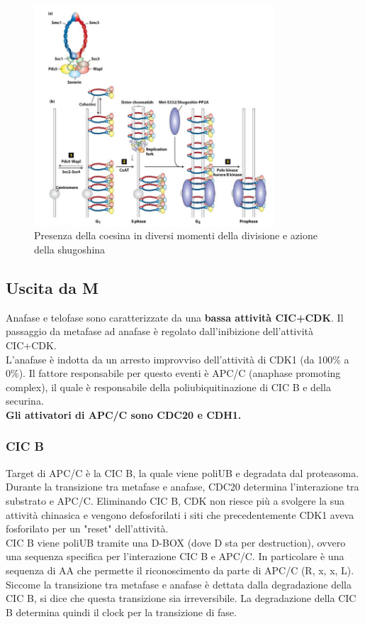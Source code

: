             \begin{figure}[h]
                \centering
                \includegraphics[width=0.8\textwidth]{images/shugoshina.JPG}
                \caption{\small Presenza della coesina in diversi momenti della divisione e azione della shugoshina}
                \label{fig:mesh1}
            \end{figure}
    
    \subsection{Uscita da M}
        Anafase e telofase sono caratterizzate da una \textbf{bassa attività CIC+CDK}. Il passaggio da metafase ad anafase è regolato dall'inibizione dell'attività CIC+CDK.\\
        L'anafase è indotta da un arresto improvviso dell'attività di CDK1 (da 100\% a 0\%).
        Il fattore responsabile per questo eventi è APC/C (anaphase promoting complex), il quale è responsabile della poliubiquitinazione di CIC B e della securina.\\
        \textbf{Gli attivatori di APC/C sono CDC20 e CDH1.}
        
        \subsubsection{CIC B}
            Target di APC/C è la CIC B, la quale viene poliUB e degradata dal proteasoma. Durante la transizione tra metafase e anafase, CDC20 determina l'interazione tra substrato e APC/C. 
            Eliminando CIC B, CDK non riesce più a svolgere la sua attività chinasica e vengono defosforilati i siti che precedentemente CDK1 aveva fosforilato per un "reset" dell'attività.\\
            CIC B viene poliUB tramite una D-BOX (dove D sta per destruction), ovvero una sequenza specifica per l'interazione CIC B e APC/C. In particolare è una sequenza di AA che permette il riconoscimento da parte di APC/C (R, x, x, L).\\
            Siccome la transizione tra metafase e anafase è dettata dalla degradazione della CIC B, si dice che questa transizione sia irreversibile. La degradazione della CIC B determina quindi il clock per la transizione di fase. 
        
